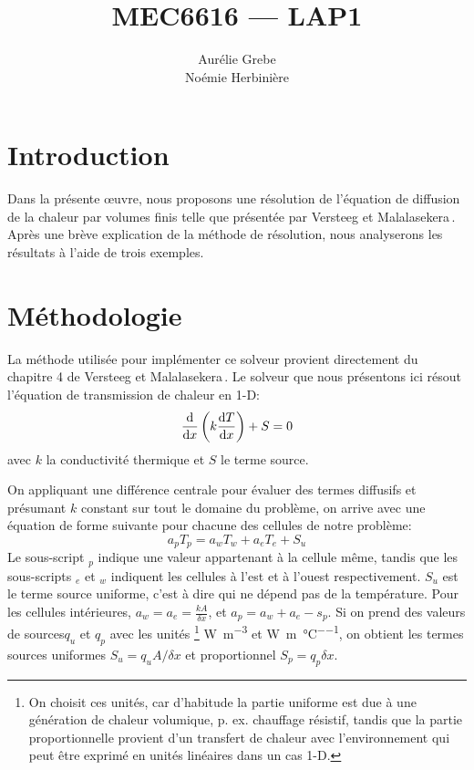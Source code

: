 \documentclass[12pt]{article}
\title{MEC6616 --- LAP1}
\author{Aurélie Grebe\\Noémie Herbinière}
\date{\displaydate{duedate}}
\begin{document}
\maketitle

\section{Introduction}

Dans la présente œuvre, nous proposons une résolution de l'équation de diffusion
de la chaleur par volumes finis telle que présentée par Versteeg et
Malalasekera\,\cite{versteeg_introduction_2007}. Après une brève explication de
la méthode de résolution, nous analyserons les résultats à l'aide de trois exemples.

\section{Méthodologie}

La méthode utilisée pour implémenter ce solveur provient directement du chapitre
4 de Versteeg et Malalasekera\,\cite{versteeg_introduction_2007}. Le solveur
que nous présentons ici résout l'équation de transmission de chaleur en 1-D:
\begin{equation}
	\odv{}{x}\left( k\odv{T}{x}\right) + S = 0
\end{equation}
avec $k$ la conductivité thermique et $S$ le terme source.

On appliquant une différence centrale pour évaluer des termes diffusifs et
présumant $k$ constant sur tout le domaine du problème, on arrive avec
une équation de forme suivante pour chacune des cellules de notre problème:
\begin{equation}
	a_p T_p = a_w T_w + a_e T_e + S_u
\end{equation}
Le sous-script $_p$ indique une valeur appartenant à la cellule même, tandis que
les sous-scripts $_e$ et $_w$ indiquent les cellules à l'est et à l'ouest
respectivement. $S_u$ est le terme source uniforme, c'est à dire qui ne dépend
pas de la température. Pour les cellules intérieures, $a_w = a_e =
\frac{kA}{\delta x}$, et $a_p = a_w + a_e - s_p$. Si on prend des valeurs 
de sources$q_u$ et $q_p$ avec les unités 
\footnote{On choisit ces unités, car d'habitude
la partie uniforme est due à une génération de chaleur volumique, p. ex.
chauffage résistif, tandis que la partie proportionnelle provient d'un transfert
de chaleur avec l'environnement qui peut être exprimé en unités linéaires dans un 
cas 1-D.}
\unit{\watt\per\m\cubed} et \unit{\watt\per\m\per\celsius}, on obtient les
termes sources uniformes
$S_u = q_uA/\delta x$ et proportionnel $S_p = q_p \delta x$.
\end{document}

